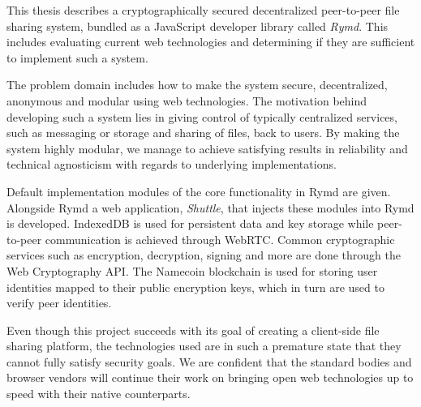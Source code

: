 %

This thesis describes a cryptographically secured decentralized peer-to-peer file sharing system, bundled as a JavaScript developer library called \emph{Rymd}. This includes evaluating current web technologies and determining if they are sufficient to implement such a system.

The problem domain includes how to make the system secure, decentralized, anonymous and modular using web technologies. The motivation behind developing such a system lies in giving control of typically centralized services, such as messaging or storage and sharing of files, back to users. By making the system highly modular, we manage to achieve satisfying results in reliability and technical agnosticism with regards to underlying implementations.

Default implementation modules of the core functionality in Rymd are given. Alongside Rymd a web application, \emph{Shuttle}, that injects these modules into Rymd is developed. IndexedDB is used for persistent data and key storage while peer-to-peer communication is achieved through WebRTC. Common cryptographic services such as encryption, decryption, signing and more are done through the Web Cryptography API. The Namecoin blockchain is used for storing user identities mapped to their public encryption keys, which in turn are used to verify peer identities.

Even though this project succeeds with its goal of creating a client-side file sharing platform, the technologies used are in such a premature state that they cannot fully satisfy security goals. We are confident that the standard bodies and browser vendors will continue their work on bringing open web technologies up to speed with their native counterparts.
